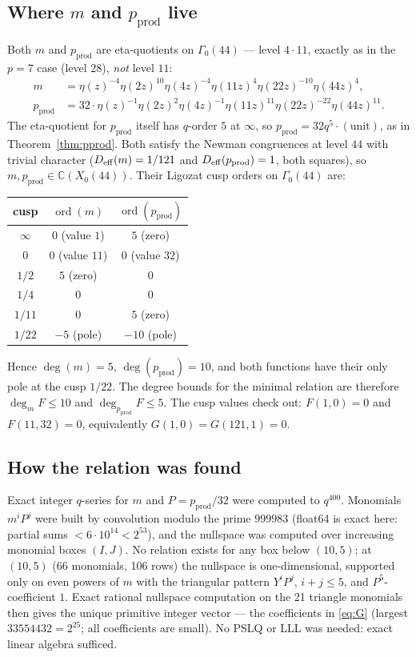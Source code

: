 \documentclass[11pt]{amsart}
\theoremstyle{plain}
\theoremstyle{definition}
\theoremstyle{remark}
\newcommand{\C}{\mathbb{C}}
\newcommand{\pprod}{p_{\mathrm{prod}}}
\begin{document}
\subsection{Where $m$ and $\pprod$ live}

Both $m$ and $\pprod$ are eta-quotients on $\Gamma_0(44)$ --- level $4\cdot 11$,
exactly as in the $p=7$ case (level $28$), \emph{not} level $11$:
\begin{align}
m &= \eta(z)^{-4}\eta(2z)^{10}\eta(4z)^{-4}\eta(11z)^4\eta(22z)^{-10}\eta(44z)^4, \\
\pprod &= 32\cdot\eta(z)^{-1}\eta(2z)^2\eta(4z)^{-1}\eta(11z)^{11}\eta(22z)^{-22}\eta(44z)^{11}.
\end{align}
The eta-quotient for $\pprod$ itself has $q$-order $5$ at $\infty$, so
$\pprod = 32q^5\cdot(\text{unit})$, as in Theorem~\ref{thm:pprod}.
Both satisfy the Newman congruences at level $44$ with trivial character
($D_{\rm eff}(m) = 1/121$ and $D_{\rm eff}(\pprod) = 1$, both squares), so
$m, \pprod \in \C(X_0(44))$. Their Ligozat cusp orders on $\Gamma_0(44)$ are:
\begin{center}
\begin{tabular}{c|c|c}
cusp & $\operatorname{ord}(m)$ & $\operatorname{ord}(\pprod)$ \\ \hline
$\infty$ & $0$ (value $1$) & $5$ (zero) \\
$0$ & $0$ (value $11$) & $0$ (value $32$) \\
$1/2$ & $5$ (zero) & $0$ \\
$1/4$ & $0$ & $0$ \\
$1/11$ & $0$ & $5$ (zero) \\
$1/22$ & $-5$ (pole) & $-10$ (pole)
\end{tabular}
\end{center}
Hence $\deg(m) = 5$, $\deg(\pprod) = 10$, and both functions have their only pole
at the cusp $1/22$. The degree bounds for the minimal relation are therefore
$\deg_m F \leq 10$ and $\deg_{\pprod} F \leq 5$. The cusp values check out:
$F(1,0) = 0$ and $F(11,32) = 0$, equivalently $G(1,0) = G(121,1) = 0$.

\subsection{How the relation was found}

Exact integer $q$-series for $m$ and $P = \pprod/32$ were computed to $q^{400}$.
Monomials $m^iP^j$ were built by convolution modulo the prime $999983$ (float64 is
exact here: partial sums $< 6\cdot 10^{14} < 2^{53}$), and the nullspace was computed
over increasing monomial boxes $(I,J)$. No relation exists for any box below
$(10,5)$; at $(10,5)$ (66 monomials, 106 rows) the nullspace is one-dimensional,
supported only on even powers of $m$ with the triangular pattern $Y^iP^j$,
$i+j \leq 5$, and $P^5$-coefficient $1$. Exact rational nullspace computation on the
21 triangle monomials then gives the unique primitive integer vector --- the
coefficients in \eqref{eq:G} (largest $33554432 = 2^{25}$; all coefficients are
small). No PSLQ or LLL was needed: exact linear algebra sufficed.
\end{document}
